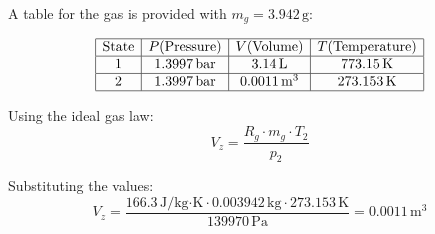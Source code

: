 A table for the gas is provided with \( m_g = 3.942 \, \text{g} \):  

\[
\begin{array}{|c|c|c|c|}
\hline
\text{State} & P (\text{Pressure}) & V (\text{Volume}) & T (\text{Temperature}) \\
\hline
1 & 1.3997 \, \text{bar} & 3.14 \, \text{L} & 773.15 \, \text{K} \\
\hline
2 & 1.3997 \, \text{bar} & 0.0011 \, \text{m}^3 & 273.153 \, \text{K} \\
\hline
\end{array}
\]

Using the ideal gas law:  
\[
V_z = \frac{R_g \cdot m_g \cdot T_2}{p_2}
\]

Substituting the values:  
\[
V_z = \frac{166.3 \, \text{J/kg·K} \cdot 0.003942 \, \text{kg} \cdot 273.153 \, \text{K}}{139970 \, \text{Pa}} = 0.0011 \, \text{m}^3
\]